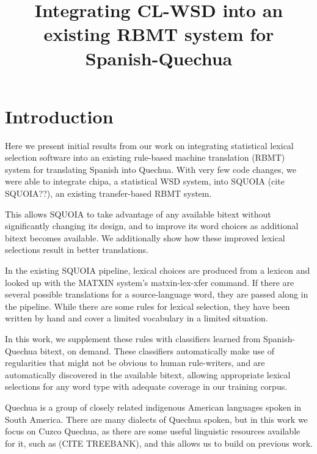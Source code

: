 \documentclass[10pt, a4paper]{article}
\title{Integrating CL-WSD into an existing RBMT system for Spanish-Quechua}
\begin{document}
\maketitleabstract

\section{Introduction}
Here we present initial results from our work on integrating statistical
lexical selection software into an existing rule-based machine translation
(RBMT) system for translating Spanish into Quechua.
With very few code changes, we were able to integrate chipa, a statistical WSD
system, into SQUOIA (cite SQUOIA??), an existing transfer-based RBMT system.

This allows SQUOIA to take advantage of any available bitext without
significantly changing its design, and to improve its word choices as
additional bitext becomes available. We additionally show how these improved
lexical selections result in better translations.

In the existing SQUOIA pipeline, lexical choices are produced from a lexicon
and looked up with the MATXIN system's matxin-lex-xfer command. If there are
several possible translations for a source-language word, they are passed along
in the pipeline. While there are some rules for lexical selection, they have
been written by hand and cover a limited vocabulary in a limited situation.

In this work, we supplement these rules with classifiers learned from
Spanish-Quechua bitext, on demand. These classifiers automatically make use of
regularities that might not be obvious to human rule-writers, and are
automatically discovered in the available bitext, allowing appropriate lexical
selections for any word type with adequate coverage in our training corpus.

Quechua is a group of closely related indigenous American languages spoken in
South America. There are many dialects of Quechua spoken, but in this work we
focus on Cuzco Quechua, as there are some useful linguistic resources available
for it, such as (CITE TREEBANK), and this allows us to build on previous work.
\end{document}
